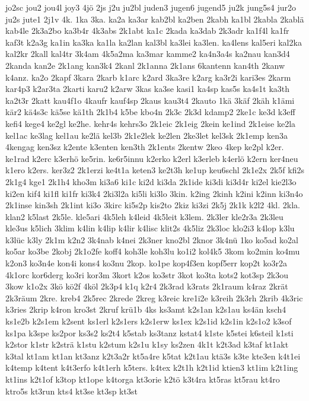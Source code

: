 {jo2sc
jou2
jou4l
joy3
4jö
2js
j2u
ju2bl
juden3
jugen6
jugend5
ju2k
jung5s4
jur2o
ju2s
jute1
2j1v
4k.
1ka
3ka.
ka2a
ka3ar
kab2bl
ka2ben
2kabh
ka1bl
2kabla
2kablä
kab4le
2k3a2bo
ka3b4r
4k3abs
2k1abt
ka1c
2kada
ka3dab
2k3adr
ka1f4l
ka1fr
kaf3t
k2a3g
ka1in
ka3ka
ka1la
ka2lan
kal3bl
ka3lei
ka3len.
ka4lens
kal5eri
kal2ka
kal2kr
2kall
kal4tr
3k4am
4k5a2ma
ka3mar
kamme2
ka4n3a4s
ka2nau
kan3d4
2kanda
kan2e
2k1ang
kan3k4
2kanl
2k1anna
2k1ans
6kantenn
kan4th
2kanw
k4anz.
ka2o
2kapf
3kara
2karb
k1arc
k2ard
3ka3re
k2arg
ka3r2i
kari3es
2karm
kar4p3
k2ar3ta
2karti
karu2
k2arw
3kas
ka3se
kasi1
ka4sp
kas5s
ka4s1t
ka3th
ka2t3r
2katt
kau4f1o
4kaufr
kauf4sp
2kaus
kau3t4
2kauto
1kä
3käf
2käh
k1ämi
kär2
kä4s3c
kä5se
kä1th
2k1b4
k5be
kbo4n
2k3c
2k3d
kdamp2
2ke1c
ke3d
k3eff
kefi4
kege4
ke2gl
ke2he.
kehr4s
kehrs3o
2k1eic
2k1eig
2kein
ke1ind
2k1eise
ke2la
kel1ac
ke3lag
kel1au
ke2lä
kel3b
2k1e2lek
ke2len
2ke3let
kel3sk
2k1emp
ken3a
4kengag
ken3sz
k2ente
k3enten
ken3th
2k1ents
2kentw
2keo
4kep
ke2pl
k2er.
ke1rad
k2erc
k3erhö
ke5rin.
ke6r5innu
k2erko
k2erl
k3erleb
k4erlö
k2ern
ker4neu
k1ero
k2ers.
ker3z2
2k1erzi
ke4t1a
keten3
ke2t3h
ke1up
keu6schl
2k1e2x
2k5f
kfi2s
2k1g4
kge1
2k1h4
kho3m
ki3a6
ki1c
ki2d
ki3da
2k1ide
ki3di
ki3d4r
ki2el
kie2l3o
ki2en
kif4
ki1fl
ki1fr
ki3k4
2ki3l2a
ki5li
ki3lo
3kin.
k2ing
2kinh
k2ini
k2inn
ki3n4o
2k1inse
kin3sh
2k1int
ki3o
3kirc
ki5s2p
kis2to
2kiz
ki3zi
2k5j
2k1k
k2l2
4kl.
2kla.
klan2
k5last
2k5le.
kle5ari
4k5leh
k4leid
4k5leit
k3lem.
2k3ler
kle2r3a
2k3leu
kle3us
k5lich
3klim
k4lin
k4lip
k4lir
k4lisc
klit2s
4k5liz
2k3loc
klo2i3
k4lop
k3lu
k3lüc
k3ly
2k1m
k2n2
3k4nab
k4nei
2k3ner
kno2bl
2knor
3k4nü
1ko
ko5ad
ko2al
ko5ar
ko3be
2kobj
2k1o2fe
koff4
koh3le
koh3lu
ko1i2
kol4k5
3kom
ko2min
ko4mu
k2on3
ko3n4e
kon4i
kons4
ko3nu
2kop.
ko1pe
kop4f3en
kopf5err
kop2t
ko3r2a
4k1orc
kor6derg
ko3ri
kor3m
3kort
k2os
ko3str
3kot
ko3ta
kots2
kot3sp
2k3ou
3kow
k1o2x
3kö
kö2f
4köl
2k3p4
k1q
k2r4
2k3rad
k3rats
2k1raum
k4raz
2krät
2k3räum
2kre.
kreb4
2k5rec
2krede
2kreg
k3reic
kre1i2e
k3reih
2k3rh
2krib
4k3ric
k3ries
2krip
k4ron
kro3st
2kruf
krü1b
4ks
ks3amt
k2s1an
k2s1au
ks4än
ksch4
ks1e2b
k2s1em
k2sent
ks1erl
k2s1ers
k2s1erw
ks1ex
k2s1id
k2s1in
k2s1o2
k3sof
ks1pa
k3spe
ks2por
ks3s2
ks2t4
k5stab
ks3tanz
kstat4
k1ste
k5stei
k6steil
k1sti
k2stor
k1str
k2strä
k1stu
k2stum
k2s1u
k1sy
ks2zen
4k1t
k2t3ad
k3taf
kt1akt
k3tal
kt1am
kt1an
kt3anz
k2t3a2r
kt5a4re
k5tat
k2t1au
ktä3s
k3te
kte3en
k4t1ei
k4temp
k4tent
k4t3erfo
k4t1erh
k5ters.
k4tex
k2t1h
k2t1id
ktien3
kt1im
k2t1ing
kt1ins
k2t1of
k3top
kt1ope
k4torga
kt3orie
k2tö
k3t4ra
kt5ras
kt5rau
kt4ro
ktro5s
kt3run
kts4
kt3se
kt3sp
kt3st
}
